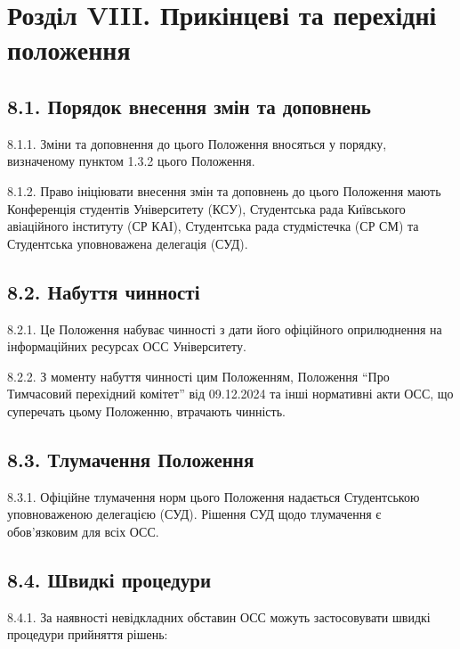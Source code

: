 \section*{Розділ VIII. Прикінцеві та перехідні положення}

\subsection*{8.1. Порядок внесення змін та доповнень}
    8.1.1. Зміни та доповнення до цього Положення вносяться у порядку, визначеному пунктом 1.3.2 цього Положення.

    8.1.2. Право ініціювати внесення змін та доповнень до цього Положення мають Конференція студентів Університету (КСУ), Студентська рада Київського авіаційного інституту (СР КАІ), Студентська рада студмістечка (СР СМ) та Студентська уповноважена делегація (СУД).

\subsection*{8.2. Набуття чинності}
    8.2.1. Це Положення набуває чинності з дати його офіційного оприлюднення на інформаційних ресурсах ОСС Університету.

    8.2.2. З моменту набуття чинності цим Положенням, Положення ``Про Тимчасовий перехідний комітет'' від 09.12.2024 та інші нормативні акти ОСС, що суперечать цьому Положенню, втрачають чинність.

\subsection*{8.3. Тлумачення Положення}
    8.3.1. Офіційне тлумачення норм цього Положення надається Студентською уповноваженою делегацією (СУД). Рішення СУД щодо тлумачення є обов'язковим для всіх ОСС.

\subsection*{8.4. Швидкі процедури}
    8.4.1. За наявності невідкладних обставин ОСС можуть застосовувати швидкі процедури прийняття рішень:

